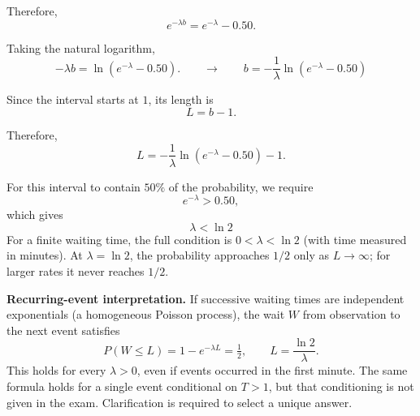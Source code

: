 {		Therefore,
		\[
		e^{-\lambda b}
		=e^{-\lambda}-0.50.
		\]
		
		Taking the natural logarithm,
		\[
		-\lambda b
		=\ln\left(e^{-\lambda}-0.50\right).
		\qquad \longrightarrow \qquad
			b=-\frac{1}{\lambda}
			\ln\left(e^{-\lambda}-0.50\right)
		\]
		
		Since the interval starts at \(1\), its length is
		\[
		L=b-1.
		\]
		
		Therefore,
		\[
		\boxed{
			L=
			-\frac{1}{\lambda}
			\ln\left(e^{-\lambda}-0.50\right)-1
		}.
		\]
		
		For this interval to contain \(50\%\) of the probability, we require
		\[
		e^{-\lambda}>0.50,
		\]
		which gives
		\[
		\boxed{\lambda<\ln 2} \]
		For a finite waiting time, the full condition is \(0<\lambda<\ln2\)
        (with time measured in minutes). At \(\lambda=\ln2\), the probability
        approaches \(1/2\) only as \(L\to\infty\); for larger rates it never reaches \(1/2\).

        \textbf{Recurring-event interpretation.} If successive waiting times are
        independent exponentials (a homogeneous Poisson process), the wait \(W\)
        from observation to the next event satisfies
        \[
        P(W\leq L)=1-e^{-\lambda L}=\tfrac12,
        \qquad \boxed{L=\frac{\ln2}{\lambda}}.
        \]
        This holds for every \(\lambda>0\), even if events occurred in the first
        minute. The same formula holds for a single event conditional on \(T>1\),
        but that conditioning is not given in the exam. Clarification is required
        to select a unique answer.
		\vspace{-5mm}
	}
	
	

